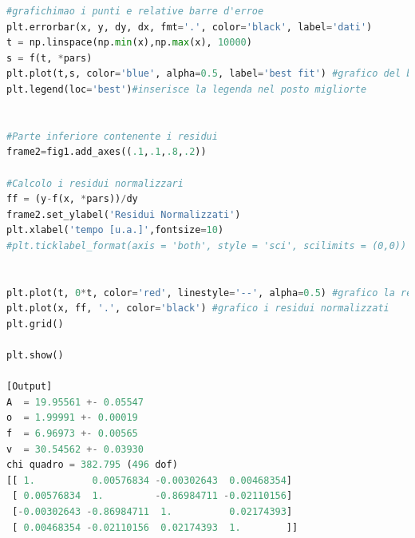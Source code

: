 \documentclass[10pt,a4paper]{article}
\begin{document}
\begin{lstlisting}[language=Python]
#grafichimao i punti e relative barre d'erroe
plt.errorbar(x, y, dy, dx, fmt='.', color='black', label='dati') 
t = np.linspace(np.min(x),np.max(x), 10000)
s = f(t, *pars)
plt.plot(t,s, color='blue', alpha=0.5, label='best fit') #grafico del best fit
plt.legend(loc='best')#inserisce la legenda nel posto migliorte


#Parte inferiore contenente i residui
frame2=fig1.add_axes((.1,.1,.8,.2))

#Calcolo i residui normalizzari
ff = (y-f(x, *pars))/dy
frame2.set_ylabel('Residui Normalizzati')
plt.xlabel('tempo [u.a.]',fontsize=10)
#plt.ticklabel_format(axis = 'both', style = 'sci', scilimits = (0,0))


plt.plot(t, 0*t, color='red', linestyle='--', alpha=0.5) #grafico la retta costantemente zero
plt.plot(x, ff, '.', color='black') #grafico i residui normalizzati
plt.grid()

plt.show()

[Output]
A  = 19.95561 +- 0.05547 
o  = 1.99991 +- 0.00019 
f  = 6.96973 +- 0.00565 
v  = 30.54562 +- 0.03930 
chi quadro = 382.795 (496 dof)
[[ 1.          0.00576834 -0.00302643  0.00468354]
 [ 0.00576834  1.         -0.86984711 -0.02110156]
 [-0.00302643 -0.86984711  1.          0.02174393]
 [ 0.00468354 -0.02110156  0.02174393  1.        ]]
 
\end{lstlisting}
\begin{center}
\end{center}

\newpage
\end{document}
